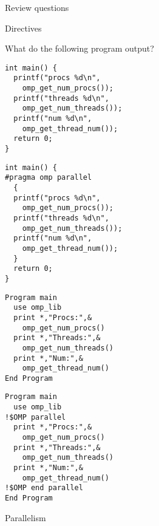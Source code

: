 \pagebreak

 {Review questions}

 {Directives}

What do the following program output?
\lstset{frame=single} %

\begin{multicols}{2}
\small
\begin{lstlisting}
int main() {
  printf("procs %d\n",
    omp_get_num_procs());
  printf("threads %d\n",
    omp_get_num_threads());
  printf("num %d\n",
    omp_get_thread_num());
  return 0;
}
\end{lstlisting}
\columnbreak

\begin{lstlisting}
int main() {
#pragma omp parallel
  {
  printf("procs %d\n",
    omp_get_num_procs());
  printf("threads %d\n",
    omp_get_num_threads());
  printf("num %d\n",
    omp_get_thread_num());
  }
  return 0;
}
\end{lstlisting}
\end{multicols}

\lstset{language=Fortran} %
\begin{multicols}{2}
\small
\begin{lstlisting}
Program main
  use omp_lib
  print *,"Procs:",&
    omp_get_num_procs()
  print *,"Threads:",&
    omp_get_num_threads()
  print *,"Num:",&
    omp_get_thread_num()
End Program
\end{lstlisting}
\columnbreak

\begin{lstlisting}
Program main
  use omp_lib
!$OMP parallel
  print *,"Procs:",&
    omp_get_num_procs()
  print *,"Threads:",&
    omp_get_num_threads()
  print *,"Num:",&
    omp_get_thread_num()
!$OMP end parallel
End Program
\end{lstlisting}
\end{multicols}

\lstset{language=C} %

\vfill\pagebreak

 {Parallelism}

